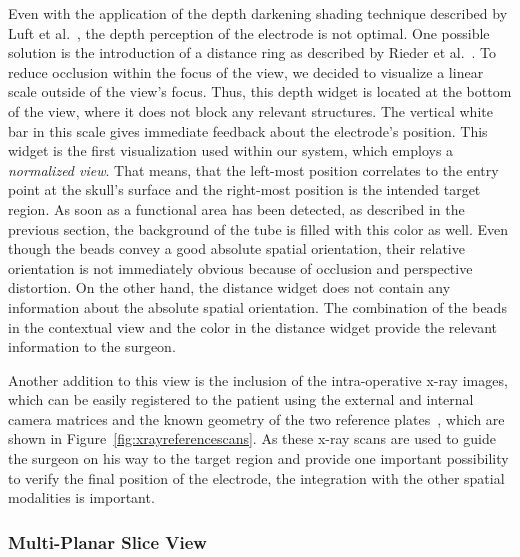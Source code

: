 \documentclass[journal]{vgtc}                %
\begin{document}
Even with the application of the depth darkening shading technique described by Luft et al.~\cite{Luft2005}, the depth perception of the electrode is not optimal. One possible solution is the introduction of a distance ring as described by Rieder et al.~\cite{Rieder2008}. To reduce occlusion within the focus of the view, we decided to visualize a linear scale outside of the view's focus. Thus, this depth widget is located at the bottom of the view, where it does not block any relevant structures. The vertical white bar in this scale gives immediate feedback about the electrode's position. This widget is the first visualization used within our system, which employs a \emph{normalized view}. That means, that the left-most position correlates to the entry point at the skull's surface and the right-most position is the intended target region. As soon as a functional area has been detected, as described in the previous section, the background of the tube is filled with this color as well. Even though the beads convey a good absolute spatial orientation, their relative orientation is not immediately obvious because of occlusion and perspective distortion. On the other hand, the distance widget does not contain any information about the absolute spatial orientation. The combination of the beads in the contextual view and the color in the distance widget provide the relevant information to the surgeon.

Another addition to this view is the inclusion of the intra-operative x-ray images, which can be easily registered to the patient using the external and internal camera matrices and the known geometry of the two reference plates~\cite{Caprile1990,Zheng2008,Hartley2004}, which are shown in Figure~\ref{fig:xrayreferencescans}. As these x-ray scans are used to guide the surgeon on his way to the target region and provide one important possibility to verify the final position of the electrode, the integration with the other spatial modalities is important.


\subsubsection{Multi-Planar Slice View}\label{sec:overview:recording:mpr}
\end{document}
